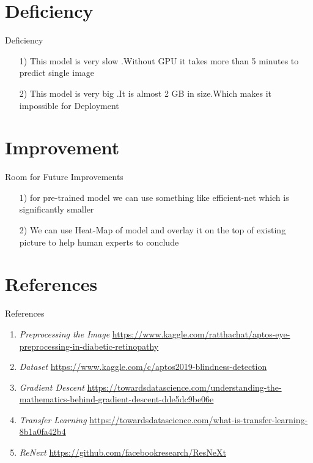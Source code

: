 \documentclass[10pt]{beamer}
\begin{document}
	\section{Deficiency}
			\begin{frame}{Deficiency }
			\begin{center}
				\begin{itemize}
					\item[1)] This model is very slow .Without GPU it takes more than 5 minutes to predict single image \pause
					\item[2)] This model is very big .It is almost 2 GB in size.Which makes it impossible for Deployment  \pause
				\end{itemize}
			\end{center}
			\end{frame}
	\section{Improvement}
			\begin{frame}{Room for Future Improvements}
			\begin{center}
				\begin{itemize}
					\item[1)] for pre-trained model we can use something like efficient-net which is significantly smaller \pause
					\item[2)] We can use Heat-Map of model and overlay it on the top of existing picture to help human experts to conclude  \pause
				\end{itemize}
			\end{center}
			\end{frame}
	\section{References}
			\begin{frame}{References}
				\begin{enumerate}
					\item \textit{Preprocessing the Image} \url{https://www.kaggle.com/ratthachat/aptos-eye-preprocessing-in-diabetic-retinopathy} 
					\item \textit{Dataset} \url{https://www.kaggle.com/c/aptos2019-blindness-detection} 
					\item \textit{Gradient Descent} \url {https://towardsdatascience.com/understanding-the-mathematics-behind-gradient-descent-dde5dc9be06e} 
					\item \textit{Transfer Learning} \url {https://towardsdatascience.com/what-is-transfer-learning-8b1a0fa42b4} 
					\item \textit{ReNext} \url {https://github.com/facebookresearch/ResNeXt} 
					
				\end{enumerate}
			\end{frame}
		
\endgroup
\end{document}

